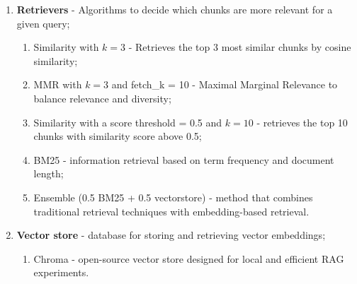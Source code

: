 \begin{enumerate}
\begin{enumerate}
        \item NLTK text splitter with chunk size = 300 tokens and chunk overlap = 20 tokens - Uses linguistic rules for more natural splits.
    \end{enumerate}
    \item \textbf{Retrievers} - Algorithms to decide which chunks are more relevant for a given query;
    \begin{enumerate}
        \item Similarity with $k = 3$ - Retrieves the top 3 most similar chunks by cosine similarity;
        \item MMR with $k = 3$ and fetch\_k = 10 - Maximal Marginal Relevance to balance relevance and diversity;
        \item Similarity with a score threshold = 0.5 and $k = 10$ - retrieves the top 10 chunks with similarity score above 0.5;
        \item BM25 - information retrieval based on term frequency and document length;
        \item Ensemble (0.5 BM25 + 0.5 vectorstore) - method that combines traditional retrieval techniques with embedding-based retrieval.
    \end{enumerate}
    \item \textbf{Vector store} - database for storing and retrieving vector embeddings;
    \begin{enumerate}
        \item Chroma - open-source vector store designed for local and efficient RAG experiments.
    \end{enumerate}
\end{enumerate}

